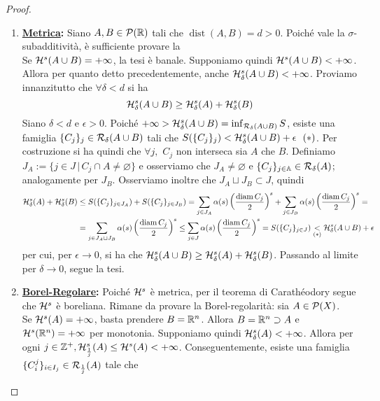 \begin{proof}
\begin{enumerate}[label=\textbf{\Large\arabic*.}, ref=\textbf{\underline{(\arabic*)}}]
\begin{enumerate}[resume,label=$\roman*)$]
      \end{enumerate}
      \item \textbf{\underline{Metrica}:} Siano $A,B\in \mathcal{P}(\mathbb{R})$ tali che $\operatorname{dist}(A,B)=d>0$. Poiché vale la $\sigma$-subadditività, è sufficiente provare la \\
      Se $\mathcal{H}^s(A\cup B)=+\infty$, la tesi è banale. Supponiamo quindi $\mathcal{H}^s(A\cup B)<+\infty$. Allora per quanto detto precedentemente, anche $\mathcal{H}^s_\delta(A\cup B)<+\infty$. Proviamo innanzitutto che $\forall \delta <d$ si ha \[\mathcal{H}^s_\delta(A\cup B)\geq \mathcal{H}^s_\delta(A)+\mathcal{H}^s_\delta(B)\]
      Siano $\delta < d$ e $\epsilon >0$. Poiché
      $+\infty>\mathcal{H}^s_\delta(A\cup B)=\inf_{\mathcal{R}_\delta(A\cup B)}S$, esiste una famiglia $ \{C_j\}_j\in\mathcal{R}_\delta(A\cup B)$ tali che $S(\{C_j\}_j)<\mathcal{H}^s_\delta(A\cup B)+\epsilon\ \ (*)$. Per costruzione si ha quindi che $\forall j,$ $C_j$ non interseca sia $A$ che $B$. Definiamo $J_A:=\{j\in J\,|\,C_j\cap A\neq \varnothing\}$ e osserviamo che $J_A\neq \varnothing$ e $\{C_j\}_{j\in \mathbb{A}}\in \mathcal{R}_\delta (A)$; analogamente per $J_B$. Osserviamo inoltre che $J_A\sqcup J_B\subset J$, quindi 
      \[\begin{aligned}\mathcal{H}^s_\delta(A)+\mathcal{H}^s_\delta(B)&\leq S(\{C_j\}_{j\in J_A})+S(\{C_j\}_{j\in J_B})= \sum_{j\in J_A}\alpha(s)\left( \frac{\operatorname{diam}C_j}{2} \right)^s+\sum_{j\in J_B}\alpha(s)\left( \frac{\operatorname{diam}C_j}{2} \right)^s=\\&=\sum_{j\in J_A\sqcup J_B}\alpha(s)\left( \frac{\operatorname{diam}C_j}{2} \right)^s\leq \sum_{j\in J}\alpha(s)\left( \frac{\operatorname{diam}C_j}{2} \right)^s=S(\{C_j\}_{j\in J})\underset{(*)}<\mathcal{H}^s_\delta(A\cup B)+\epsilon\end{aligned}\] 
      per cui, per $\epsilon \to 0$, si ha che $\mathcal{H}^s_\delta(A\cup B)\geq \mathcal{H}^s_\delta(A)+\mathcal{H}^s_\delta(B)$. Passando al limite per $\delta \to 0$, segue la tesi. 
      \item \textbf{\underline{Borel-Regolare}:} Poiché $\mathcal{H}^s$ è metrica, per il teorema di Carathéodory segue che $\mathcal{H}^s$ è boreliana. Rimane da provare la Borel-regolarità: sia $A\in \mathcal{P}(X)$. \\
      Se $\mathcal{H}^s(A)=+\infty$, basta prendere $B=\mathbb{R}^n$. Allora $B=\mathbb{R}^n\supset A$ e $\mathcal{H}^s(\mathbb{R}^n)=+\infty$ per monotonia. Supponiamo quindi $\mathcal{H}^s_\delta(A)<+\infty$. Allora per ogni $j\in \mathbb{Z}^+, \mathcal{H}^s_\frac{1}{j}(A)\leq \mathcal{H}^s(A)<+\infty$. Conseguentemente, esiste una famiglia $\{C_i^j\}_{i\in I_j}\in \mathcal{R}_{\frac{1}{j}}(A)$ tale che

\end{enumerate}
\end{proof}
